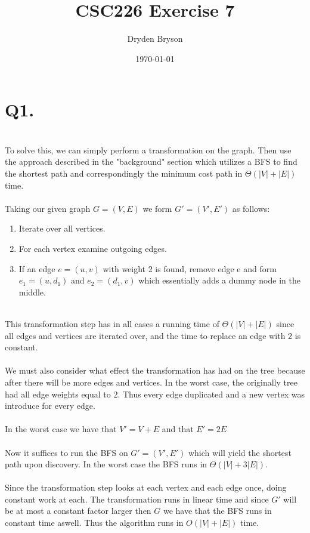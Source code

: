 \documentclass{article}
\title{CSC226 Exercise 7}
\author{Dryden Bryson}
\date{\today}
\begin{document}
\maketitle
\newpage
\section*{Q1.}\\
To solve this, we can simply perform a transformation on the graph. Then use the approach described in the "background" section which utilizes a BFS to find the shortest path and correspondingly the minimum cost path in $\Theta(|V|+|E|)$ time.\\\\
Taking our given graph $G=(V,E)$ we form $G'=(V',E')$ as follows:
\begin{enumerate}[i]
    \item Iterate over all vertices.
    \item For each vertex examine outgoing edges.
    \item If an edge $e=(u,v)$ with weight 2 is found, remove edge e and form $e_{1}=(u,d_{1})$ and $e_{2}=(d_{1},v)$ which essentially adds a dummy node in the middle.
\end{enumerate}\\
This transformation step has in all cases a running time of $\Theta(|V|+|E|)$ since all edges and vertices are iterated over, and the time to replace an edge with 2 is constant.\\\\
We must also consider what effect the transformation has had on the tree because after there will be more edges and vertices. In the worst case, the originally tree had all edge weights equal to 2. Thus every edge duplicated and a new vertex was introduce for every edge.\\\\
In the worst case we have that $V'=V+E$ and that $E'=2E$\\\\
Now it suffices to run the BFS on $G'=(V',E')$ which will yield the shortest path upon discovery. In the worst case the BFS runs in $\Theta(|V|+3|E|)$.\\\\
Since the transformation step looks at each vertex and each edge once, doing constant work at each. The transformation runs in linear time and since $G'$ will be at most a constant factor larger then $G$ we have that the BFS runs in constant time aswell. Thus the algorithm runs in $O(|V|+|E|)$ time.
\end{document}
